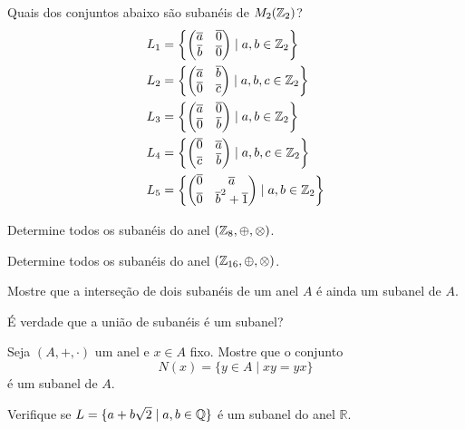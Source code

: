 \documentclass[12pt]{exam}
\begin{document}
    \vspace{.3cm}

    \questao{} Quais dos conjuntos abaixo s\~ao suban\'eis de $M_2(\mathbb{Z}_2)$?
    \begin{align*}
        L_1 &= \left\{\begin{pmatrix}
            \overline{a} & \overline{0}\\
            \overline{b} & \overline{0}
        \end{pmatrix} \mid a, b \in \mathbb{Z}_2\right\}\\
        L_2 &= \left\{\begin{pmatrix}
            \overline{a} & \overline{b}\\
            \overline{0} & \overline{c}
        \end{pmatrix} \mid a, b, c \in \mathbb{Z}_2\right\}\\
        L_3 &= \left\{\begin{pmatrix}
            \overline{a} & \overline{0}\\
            \overline{0} & \overline{b}
        \end{pmatrix} \mid a, b \in \mathbb{Z}_2\right\}\\
        L_4 &= \left\{\begin{pmatrix}
            \overline{0} & \overline{a}\\
            \overline{c} & \overline{b}
        \end{pmatrix} \mid a, b, c \in \mathbb{Z}_2\right\}\\
        L_5 &= \left\{\begin{pmatrix}
            \overline{0} & \overline{a}\\
            \overline{0} & \overline{b}^2 + \overline{1}
        \end{pmatrix} \mid a, b \in \mathbb{Z}_2\right\}
    \end{align*}

    \vspace{.3cm}

    \questao{} Determine todos os suban\'eis do anel $(\mathbb{Z}_8, \oplus, \otimes)$.

    \vspace{.3cm}

    \questao{} Determine todos os suban\'eis do anel $(\mathbb{Z}_{16}, \oplus, \otimes)$.

    \vspace{.3cm}

    \questao{} Mostre que a interse\c{c}\~ao de dois suban\'eis de um anel $A$ \'e ainda um subanel de $A$.

    \vspace{.3cm}

    \questao{} \'E verdade que a uni\~ao de suban\'eis \'e um subanel?

    \vspace{.3cm}

    \questao{} Seja $(A, + , \cdot)$ um anel e $x \in A$ fixo. Mostre que o conjunto
    \[
        N(x) = \{y \in A \mid xy = yx\}
    \]
    \'e um subanel de $A$.

    \vspace{.3cm}

    \questao{} Verifique se $L = \{ a + b\sqrt{2} \mid a, b \in \mathbb{Q}\}$ {\'e} um subanel
    do anel $\mathbb{R}$.
\end{document}
